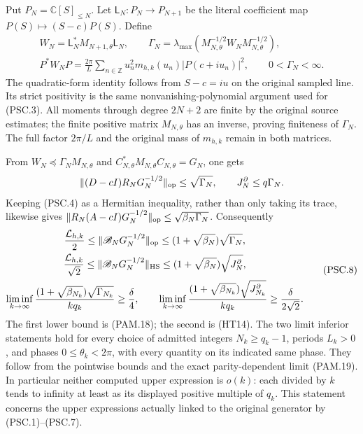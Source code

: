 Put \(P_N=\mathbb C[S]_{\le N}\). Let
\(\mathsf L_N:P_N\to P_{N+1}\) be the literal coefficient map
\(P(S)\mapsto(S-c)P(S)\). Define
\[
 \begin{gathered}
 W_N=\mathsf L_N^*M_{N+1,\theta}\mathsf L_N,\qquad
 \Gamma_N=
 \lambda_{\max}(M_{N,\theta}^{-1/2}W_NM_{N,\theta}^{-1/2}),\\
 P^*W_NP=
 \frac{2\pi}{L}\sum_{n\in\mathbb Z}
 u_n^2m_{h,k}(u_n)|P(c+iu_n)|^2,\qquad
 0<\Gamma_N<\infty .
 \end{gathered}
 \tag{PSC.7}\label{eq:psc-moment}
\]
The quadratic-form identity follows from \(S-c=iu\) on the
original sampled line. Its strict positivity is the same
nonvanishing-polynomial argument used for (PSC.3).
All moments through degree \(2N+2\) are finite by the original
source estimates; the finite positive matrix \(M_{N,\theta}\)
has an inverse, proving finiteness of \(\Gamma_N\).
The full factor \(2\pi/L\) and the original mass of \(m_{h,k}\)
remain in both matrices.

From \(W_N\preceq\Gamma_NM_{N,\theta}\) and
\(C_{N,\theta}^*M_{N,\theta}C_{N,\theta}=G_N\), one gets
\[
 \|(D-cI)R_NG_N^{-1/2}\|_{\rm op}\le\sqrt{\Gamma_N},
 \qquad J_N^\partial\le q\Gamma_N .
\]
Keeping (PSC.4) as a Hermitian inequality, rather than only taking
its trace, likewise gives
\(\|R_N(A-cI)G_N^{-1/2}\|_{\rm op}
 \le\sqrt{\beta_N\Gamma_N}\).
Consequently
\[
 \begin{gathered}
 \frac{\mathcal L_{h,k}}2
 \le\|\mathscr B_NG_N^{-1/2}\|_{\rm op}
 \le(1+\sqrt{\beta_N})\sqrt{\Gamma_N},\\
 \frac{\mathcal L_{h,k}}{\sqrt2}
 \le\|\mathscr B_NG_N^{-1/2}\|_{\rm HS}
 \le(1+\sqrt{\beta_N})\sqrt{J_N^\partial},\\
 \liminf_{k\to\infty}
 \frac{(1+\sqrt{\beta_{N_k}})\sqrt{\Gamma_{N_k}}}{kq_k}
 \ge\frac{\delta}{4},\qquad
 \liminf_{k\to\infty}
 \frac{(1+\sqrt{\beta_{N_k}})\sqrt{J_{N_k}^\partial}}{kq_k}
 \ge\frac{\delta}{2\sqrt2}.
 \end{gathered}
 \tag{PSC.8}\label{eq:psc-upperfloor}
\]
The first lower bound is (PAM.18); the second is (HT14).
The two limit inferior statements hold for every choice of
admitted integers \(N_k\ge q_k-1\), periods \(L_k>0\), and phases
\(0\le\theta_k<2\pi\), with every quantity on its indicated
same phase. They follow from the pointwise bounds and the exact
parity-dependent limit (PAM.19). In particular neither computed
upper expression is \(o(k)\): each divided by \(k\) tends to
infinity at least as its displayed positive multiple of \(q_k\).
This statement concerns the upper expressions actually linked
to the original generator by (PSC.1)--(PSC.7).

